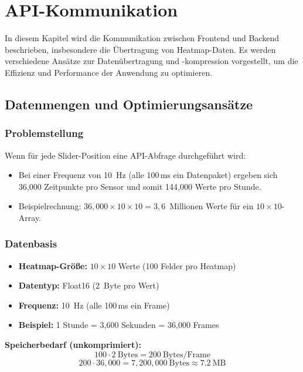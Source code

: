 \chapter{API-Kommunikation}
In diesem Kapitel wird die Kommunikation zwischen Frontend und Backend beschrieben, insbesondere die Übertragung von Heatmap-Daten. Es werden verschiedene Ansätze zur Datenübertragung und -kompression vorgestellt, um die Effizienz und Performance der Anwendung zu optimieren.
\section{Datenmengen und Optimierungsansätze}

\subsection{Problemstellung}
Wenn für jede Slider-Position eine API-Abfrage durchgeführt wird:
\begin{itemize}
    \item Bei einer Frequenz von 10~Hz (alle 100\,ms ein Datenpaket) ergeben sich 36{,}000 Zeitpunkte pro Sensor und somit 144{,}000 Werte pro Stunde.
    \item Beispielrechnung: $36{,}000 \times 10 \times 10 = 3{,}6$~Millionen Werte für ein $10\times10$-Array.
\end{itemize}

\subsection{Datenbasis}
\begin{itemize}
    \item \textbf{Heatmap-Größe:} $10\times10$ Werte (100 Felder pro Heatmap)
    \item \textbf{Datentyp:} Float16 (2~Byte pro Wert)
    \item \textbf{Frequenz:} 10~Hz (alle 100\,ms ein Frame)
    \item \textbf{Beispiel:} 1 Stunde = 3{,}600 Sekunden = 36{,}000 Frames
\end{itemize}

\noindent\textbf{Speicherbedarf (unkomprimiert):}
\[
100 \cdot 2\ \text{Bytes} = 200\ \text{Bytes/Frame}
\]
\[
200 \cdot 36{,}000 = 7{,}200{,}000\ \text{Bytes} \approx 7.2\ \text{MB}
\]

